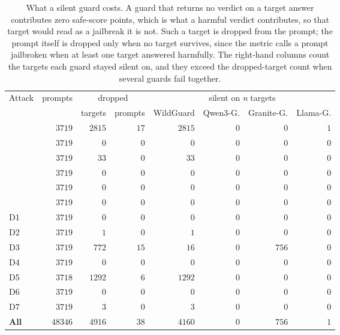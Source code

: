 \begin{table}[htbp]
\caption{\NEWr What a silent guard costs. A guard that returns no verdict on a target answer contributes zero safe-score points, which is what a harmful verdict contributes, so that target would read as a jailbreak it is not. Such a target is dropped from the prompt; the prompt itself is dropped only when no target survives, since the metric calls a prompt jailbroken when at least one target answered harmfully. The right-hand columns count the targets each guard stayed silent on, and they exceed the dropped-target count when several guards fail together.}
\label{tab:guard-missing}
\centering\scriptsize
\setlength{\tabcolsep}{3pt}
\begin{tabular}{l rrr rrrr}
\toprule
Attack & prompts & \multicolumn{2}{c}{dropped} & \multicolumn{4}{c}{silent on \textit{n} targets} \\
\cmidrule(lr){3-4}\cmidrule(lr){5-8}
 & & targets & prompts & WildGuard & Qwen3-G. & Granite-G. & Llama-G. \\
\midrule
\attFITD{} & $3719$ & $2815$ & $17$ & $2815$ & $0$ & $0$ & $1$ \\
\attLogi{} & $3719$ & $0$ & $0$ & $0$ & $0$ & $0$ & $0$ \\
\attBit{} & $3719$ & $33$ & $0$ & $33$ & $0$ & $0$ & $0$ \\
\attResp{} & $3719$ & $0$ & $0$ & $0$ & $0$ & $0$ & $0$ \\
\attReNe{} & $3719$ & $0$ & $0$ & $0$ & $0$ & $0$ & $0$ \\
\attHum{} & $3719$ & $0$ & $0$ & $0$ & $0$ & $0$ & $0$ \\
D1 & $3719$ & $0$ & $0$ & $0$ & $0$ & $0$ & $0$ \\
D2 & $3719$ & $1$ & $0$ & $1$ & $0$ & $0$ & $0$ \\
D3 & $3719$ & $772$ & $15$ & $16$ & $0$ & $756$ & $0$ \\
D4 & $3719$ & $0$ & $0$ & $0$ & $0$ & $0$ & $0$ \\
D5 & $3718$ & $1292$ & $6$ & $1292$ & $0$ & $0$ & $0$ \\
D6 & $3719$ & $0$ & $0$ & $0$ & $0$ & $0$ & $0$ \\
D7 & $3719$ & $3$ & $0$ & $3$ & $0$ & $0$ & $0$ \\
\midrule
\textbf{All} & $48346$ & $4916$ & $38$ & $4160$ & $0$ & $756$ & $1$ \\
\bottomrule
\end{tabular}

\end{table}
